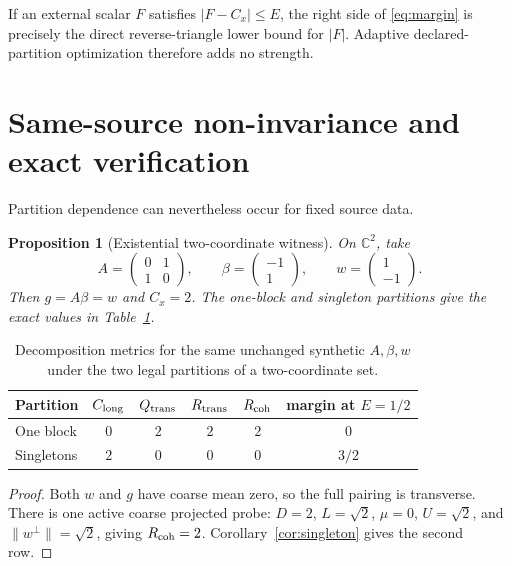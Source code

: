 \documentclass[10pt]{article}
\newtheorem{proposition}[theorem]{Proposition}
\newcommand{\C}{\mathbb{C}}
\newcommand{\norm}[1]{\lVert #1\rVert}
\begin{document}
If an external scalar $F$ satisfies $|F-C_x|\leq E$, the right side of
\eqref{eq:margin} is precisely the direct reverse-triangle lower bound for
$|F|$.  Adaptive declared-partition optimization therefore adds no strength.

\section{Same-source non-invariance and exact verification}

Partition dependence can nevertheless occur for fixed source data.

\begin{proposition}[Existential two-coordinate witness]\label{prop:witness}
On $\C^2$, take
\[
 A=\begin{pmatrix}0&1\\1&0\end{pmatrix},\qquad
 \beta=\begin{pmatrix}-1\\1\end{pmatrix},\qquad
 w=\begin{pmatrix}1\\-1\end{pmatrix}.
\]
Then $g=A\beta=w$ and $C_x=2$.  The one-block and singleton partitions give
the exact values in Table~\ref{tab:witness}.
\end{proposition}

\begin{table}[H]
\centering
\small
\begin{tabular}{lccccc}
\toprule
Partition & $C_{\rm long}$ & $Q_{\rm trans}$ & $R_{\rm trans}$ &
$R_{\rm coh}$ & margin at $E=1/2$\\
\midrule
One block & $0$ & $2$ & $2$ & $2$ & $0$\\
Singletons & $2$ & $0$ & $0$ & $0$ & $3/2$\\
\bottomrule
\end{tabular}
\caption{Decomposition metrics for the same unchanged synthetic $A,\beta,w$
under the two legal partitions of a two-coordinate set.}
\label{tab:witness}
\end{table}

\begin{proof}
Both $w$ and $g$ have coarse mean zero, so the full pairing is transverse.
There is one active coarse projected probe: $D=2$, $L=\sqrt2$, $\mu=0$,
$U=\sqrt2$, and $\norm{w^\perp}=\sqrt2$, giving $R_{\rm coh}=2$.
Corollary~\ref{cor:singleton} gives the second row.
\end{proof}
\end{document}
